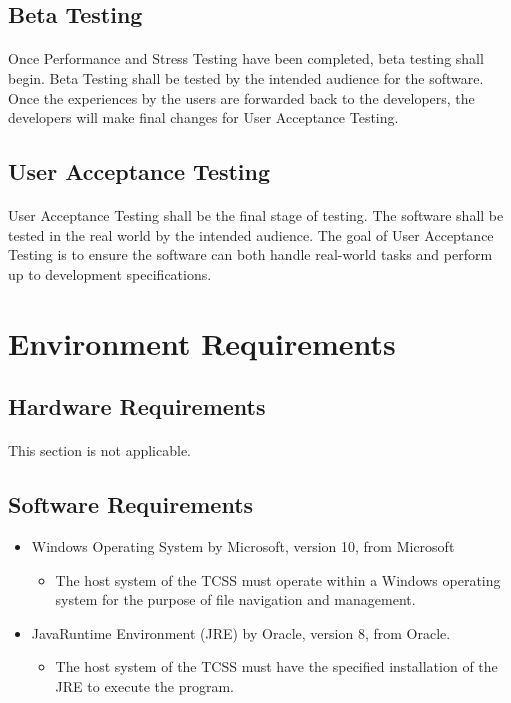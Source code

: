 \documentclass{article}
\begin{document}
    \subsection{Beta Testing}
    \paragraph{}
        Once Performance and Stress Testing have been completed, beta testing shall begin. Beta Testing shall be tested by the intended audience for the software. Once the experiences by the users are forwarded back to the developers, the developers will make final changes for User Acceptance Testing.
    \subsection{User Acceptance Testing}
    \paragraph{}
    User Acceptance Testing shall be the final stage of testing. The software shall be tested in the real world by the intended audience. The goal of User Acceptance Testing is to ensure the software can both handle real-world tasks and perform up to development specifications. 
    
\section{Environment Requirements}
    
    \subsection{Hardware Requirements}
    \paragraph{}
    This section is not applicable.
    
    \subsection{Software Requirements}
    \begin{itemize}
        \item Windows Operating System\textregistered\; by Microsoft\textregistered, version 10, from Microsoft\textregistered
        \begin{itemize}
            \item The host system of the TCSS must operate within a Windows operating system for the purpose of file navigation and management.
        \end{itemize}
        \item Java\texttrademark \;Runtime Environment (JRE) by Oracle\textregistered, version 8, from Oracle\textregistered.
        \begin{itemize}
            \item The host system of the TCSS must have the specified installation of the JRE to execute the program.
        \end{itemize}
    \end{itemize}
    
\end{document}
